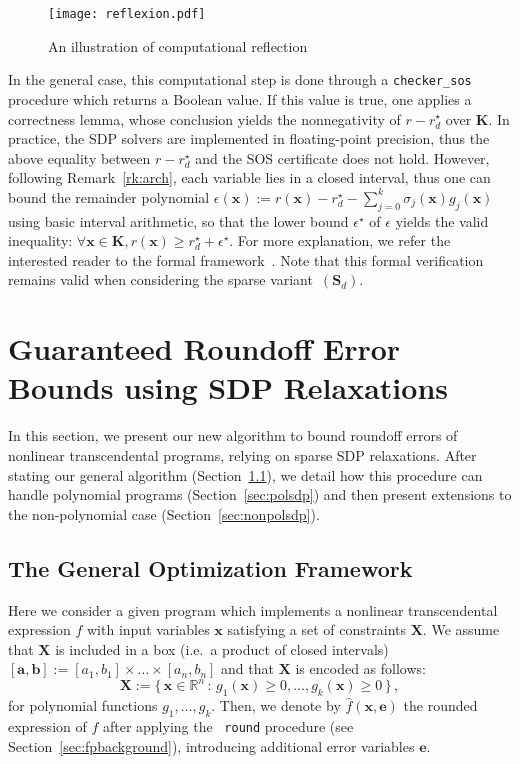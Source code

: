 \documentclass[preprint,fleqn,nocopyrightspace]{sigplanconf}
\newcommand{\code}[1]{\lstinline{#1}}
\newcommand{\R}{\mathbb{R}}
\newcommand{\x}{\mathbf{x}}
\newcommand{\e}{\mathbf{e}}
\renewcommand{\b}{\mathbf{b}}
\def\a{\mathbf{a}}
\def\S{\mathbf{S}}
\def\K{\mathbf{K}}
\def\S{\mathbf{S}}
\def\X{\mathbf{X}}
\theoremstyle{plain}
\begin{document}
\fi
%
\begin{figure}[!ht]
\centering
\texttt{[image: reflexion.pdf]}
\caption{An illustration of computational reflection}	
\label{fig:reflexion}
\end{figure}
%
In the general case, this computational step is done through a \code{checker_sos} procedure which returns a Boolean value. If this value is true, one applies a correctness lemma, whose conclusion yields the nonnegativity of $r - r_d^\star$ over $\K$.
In practice, the SDP solvers are implemented in floating-point precision, thus the above equality between $r - r_d^\star$ and the SOS certificate does not hold. However, following Remark~\ref{rk:arch}, each variable lies in a closed interval, thus one can bound the remainder polynomial $\epsilon(\x) := r(\x) - r_d^\star - \sum_{j=0}^k \sigma_j(\x) g_j(\x)$ using basic interval arithmetic, so that the lower bound $\epsilon^\star$ of $\epsilon$ yields the valid inequality: $\forall \x \in \K, r(\x) \geq r_d^\star + \epsilon^\star$.
For more explanation, we refer the interested reader to the formal framework~\cite{jfr14}. Note that this formal verification remains valid when considering the sparse variant~$(\S_d)$.
%
\section{Guaranteed Roundoff Error Bounds using SDP Relaxations}
\label{sec:fpsdp}
In this section, we present our new algorithm to bound roundoff errors of nonlinear transcendental programs, relying on sparse SDP relaxations. After stating our general algorithm (Section~\ref{sec:transcsdp}), we detail how this procedure can handle polynomial programs (Section~\ref{sec:polsdp}) and then present extensions to the non-polynomial case (Section~\ref{sec:nonpolsdp}).
\subsection{The General Optimization Framework}
\label{sec:transcsdp}
%
Here we consider a given program which implements a nonlinear transcendental expression $f$ with input variables $\x$ satisfying a set of constraints $\X$. We assume that  $\X$ is included in a box (i.e.~a product of closed intervals) $[\a, \b] := [a_1, b_1] \times \dots \times [a_n, b_n]$ and that $\X$ is encoded as follows: 
\[ 
\X := \{\, \x \in \R^n \, : \, g_1 (\x) \geq 0, \dots, g_{k} (\x) \geq 0 \,\} \,,
\]
for polynomial functions $g_1, \dots, g_k$. 
%
Then, we denote by $\hat{f}(\x,\e)$ the rounded expression of $f$ after applying the ~\lstinline|round| procedure (see Section~\ref{sec:fpbackground}), introducing additional error variables $\e$. 
\end{document}
